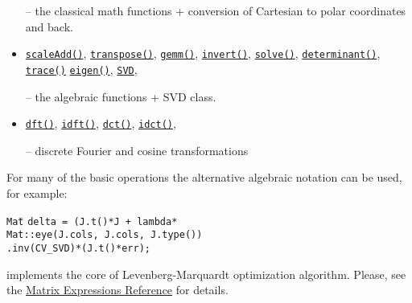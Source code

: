 \documentclass[10pt,landscape]{article}
\begin{document}
\begin{multicols}{3}
\begin{itemize}
-- the classical math functions + conversion of Cartesian to polar coordinates and back.

\item
\texttt{\href{http://opencv.willowgarage.com/documentation/cpp/operations_on_arrays.html\#cv-scaleadd}{scaleAdd()}},
\texttt{\href{http://opencv.willowgarage.com/documentation/cpp/operations_on_arrays.html\#cv-transpose}{transpose()}},
\texttt{\href{http://opencv.willowgarage.com/documentation/cpp/operations_on_arrays.html\#cv-gemm}{gemm()}},
\texttt{\href{http://opencv.willowgarage.com/documentation/cpp/operations_on_arrays.html\#cv-invert}{invert()}},
\texttt{\href{http://opencv.willowgarage.com/documentation/cpp/operations_on_arrays.html\#cv-solve}{solve()}},
\texttt{\href{http://opencv.willowgarage.com/documentation/cpp/operations_on_arrays.html\#cv-determinant}{determinant()}},
\texttt{\href{http://opencv.willowgarage.com/documentation/cpp/operations_on_arrays.html\#cv-trace}{trace()}}
\texttt{\href{http://opencv.willowgarage.com/documentation/cpp/operations_on_arrays.html\#cv-eigen}{eigen()}},
\texttt{\href{http://opencv.willowgarage.com/documentation/cpp/operations_on_arrays.html\#cv-SVD}{SVD}},

-- the algebraic functions + SVD class.

\item
\texttt{\href{http://opencv.willowgarage.com/documentation/cpp/operations_on_arrays.html\#cv-dft}{dft()}},
\texttt{\href{http://opencv.willowgarage.com/documentation/cpp/operations_on_arrays.html\#cv-idft}{idft()}},
\texttt{\href{http://opencv.willowgarage.com/documentation/cpp/operations_on_arrays.html\#cv-dct}{dct()}},
\texttt{\href{http://opencv.willowgarage.com/documentation/cpp/operations_on_arrays.html\#cv-idct}{idct()}},

-- discrete Fourier and cosine transformations 

\end{itemize}

For many of the basic operations the alternative algebraic notation can be used, for example:
\begin{tabbing}
\texttt{Mat}\={} \texttt{delta = (J.t()*J + lambda*}\\
\>\texttt{Mat::eye(J.cols, J.cols, J.type())}\\
\>\texttt{.inv(CV\_SVD)*(J.t()*err);}
\end{tabbing}
implements the core of Levenberg-Marquardt optimization algorithm.
Please, see the \href{http://opencv.willowgarage.com/documentation/cpp/basic_structures.html#matrix-expressions}{Matrix Expressions Reference} for details.



\end{multicols}
\end{document}
